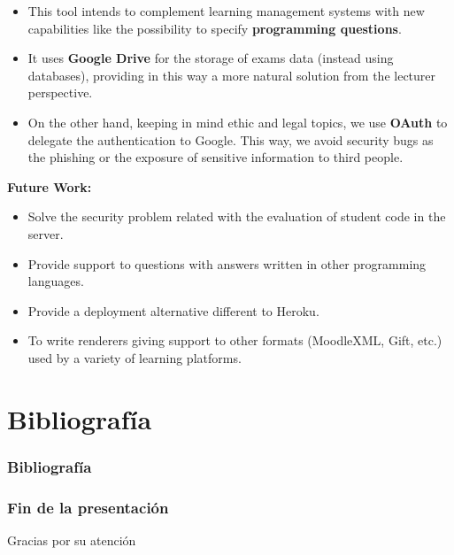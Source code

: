 \documentclass{beamer}
\begin{document}
\begin{frame}[allowframebreaks]
  \begin{itemize}
    \item This tool intends to complement learning management systems with new capabilities like the possibility to specify {\bfseries programming questions}.
    \item It uses {\bfseries Google Drive} for the storage of exams data (instead using databases),
    providing in this way a more natural solution from the lecturer perspective.
    \item On the other hand, keeping in mind ethic and legal topics, we use {\bfseries OAuth} to delegate the authentication to Google. 
    This way, we avoid security bugs as the phishing or the exposure of sensitive information to third people.
  \end{itemize}
  \framebreak
  
  {\bf Future Work:}
  \begin{itemize}
    \item Solve the security problem related with the evaluation of student code in the server.
    \item Provide support to questions with answers written in other programming languages.
    \item Provide a deployment alternative different to Heroku.
    \item To write renderers giving support to other formats (MoodleXML, Gift, etc.) used by a variety of learning platforms.
  \end{itemize}
\end{frame}


\section{Bibliografía}
\begin{frame}[allowframebreaks]
  \frametitle{Bibliografía}
  
  
  \nocite{*}
\end{frame}

\begin{frame}
  \frametitle{Fin de la presentación}
  \begin{center}
    \Huge{Gracias por su atención}
  \end{center}
\end{frame}
\end{document}
